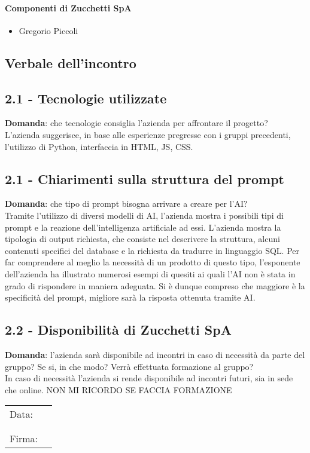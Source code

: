 \documentclass[italian,12pt]{article} %
\begin{document}
\paragraph{Componenti di Zucchetti SpA}
\begin{itemize}
	\item Gregorio Piccoli
\end{itemize}

\newpage

\begin{flushleft}
\section{Verbale dell'incontro}
\subsection*{2.1 - Tecnologie utilizzate}
	\textbf{Domanda}: che tecnologie consiglia l'azienda per affrontare il progetto?\\
	L'azienda suggerisce, in base alle esperienze pregresse con i gruppi precedenti, l'utilizzo di Python, interfaccia in HTML, JS, CSS.

\subsection*{2.1 - Chiarimenti sulla struttura del prompt}
	\textbf{Domanda}: che tipo di prompt bisogna arrivare a creare per l'AI?\\
	Tramite l'utilizzo di diversi modelli di AI, l'azienda mostra i possibili tipi di prompt e la reazione dell'intelligenza artificiale ad essi. L'azienda mostra la tipologia di output richiesta, che consiste nel descrivere la struttura, alcuni contenuti specifici del database e la richiesta da tradurre in linguaggio SQL. Per far comprendere al meglio la necessità di un prodotto di questo tipo, l’esponente dell’azienda ha illustrato numerosi esempi 
	di quesiti ai quali l’AI non è stata in grado di rispondere in maniera adeguata. Si è dunque compreso che maggiore è la specificità 
	del prompt, migliore sarà la risposta ottenuta tramite AI.

\subsection*{2.2 - Disponibilità di Zucchetti SpA}
	\textbf{Domanda}: l'azienda sarà disponibile ad incontri in caso di necessità da parte del gruppo? Se si, in che modo? Verrà effettuata formazione al gruppo?\\
	In caso di necessità l'azienda si rende disponibile ad incontri futuri, sia in sede che online. NON MI RICORDO SE FACCIA FORMAZIONE
	


\end{flushleft}

\begin{table}[b]
	\begin{tabular}{@{}p{.5in}p{4in}@{}}
		Data:  & \hrulefill \\
			   &     		\\
			   &     		\\
		Firma: & \hrulefill \\
	\end{tabular}
	\end{table}
\end{document}
